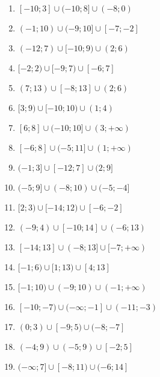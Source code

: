 \documentclass[12pt,a4paper]{article}
\begin{document}
\begin{ex}
\begin{enumerate}
		\item $[-10;3]\cup(-10;8]\cup(-8;0)$
		\item $(-1;10)\cup(-9;10]\cup[-7;-2]$
		\item $(-12;7)\cup[-10;9)\cup(2;6)$
		\item $[-2;2)\cup[-9;7)\cup[-6;7]$
		\item $(7;13)\cup[-8;13]\cup(2;6)$
		\item $[3;9)\cup[-10;10)\cup(1;4)$
		\item $[6;8]\cup(-10;10]\cup(3;+ \infty)$
		\item $[-6;8]\cup(-5;11]\cup(1;+ \infty)$
		\item $(-1;3]\cup[-12;7]\cup(2;9]$
		\item $(-5;9]\cup(-8;10)\cup(-5;-4]$
		\item $[2;3)\cup[-14;12)\cup[-6;-2]$
		\item $(-9;4)\cup[-10;14]\cup(-6;13)$
		\item $[-14;13]\cup(-8;13]\cup[-7;+ \infty)$
		\item $[-1;6)\cup[1;13)\cup[4;13]$
		\item $[-1;10)\cup(-9;10)\cup(-1;+ \infty)$
		\item $[-10;-7)\cup(-\infty;-1]\cup(-11;-3)$
		\item $(0;3)\cup[-9;5)\cup(-8;-7]$
		\item $(-4;9)\cup(-5;9)\cup[-2;5]$
		\item $(-\infty;7]\cup[-8;11)\cup(-6;14]$
	\end{enumerate}
\end{ex}
\end{document}
